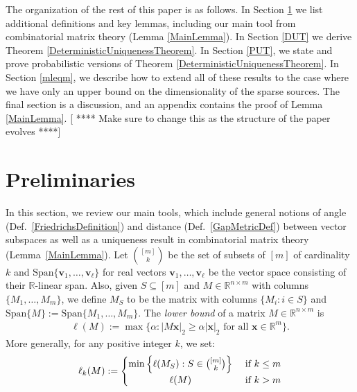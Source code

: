 \documentclass[journal, onecolumn]{IEEEtran}
\begin{document}
The organization of the rest of this paper is as follows. In Section \ref{Preliminaries} we list additional definitions and key lemmas, including our main tool from combinatorial matrix theory (Lemma \ref{MainLemma}). In Section \ref{DUT} we derive Theorem \ref{DeterministicUniquenessTheorem}. In Section \ref{PUT}, we state and prove probabilistic versions of Theorem \ref{DeterministicUniquenessTheorem}. In Section \ref{mleqm}, we describe how to extend all of these results to the case where we have only an upper bound on the dimensionality of the sparse sources. The final section is a discussion, and an appendix contains the proof of Lemma \ref{MainLemma}.
[ **** Make sure to change this as the structure of the paper evolves ****]


\section{Preliminaries}\label{Preliminaries}
In this section, we review our main tools, which include general notions of angle (Def.~\ref{FriedrichsDefinition}) and distance (Def.~\ref{GapMetricDef}) between vector subspaces as well as a uniqueness result in combinatorial matrix theory (Lemma~\ref{MainLemma}).
Let ${[m] \choose k}$ be the set of subsets of $[m]$ of cardinality $k$ and $\text{Span}\{\mathbf{v}_1, \ldots, \mathbf{v}_\ell\}$ for real vectors $\mathbf{v}_1, \ldots, \mathbf{v}_\ell$ be the vector space consisting of their $\mathbb{R}$-linear span.
%
%
Also, given $S \subseteq [m]$ and $M \in \mathbb{R}^{n \times m}$ with columns $\{M_1,\ldots,M_m\}$, we define $M_S$ to be the matrix with columns $\{M_i: i \in S\}$ and $\text{Span}\{M\} := \text{Span}\{M_1, \ldots, M_m\}$.  The \emph{lower bound} of a matrix $M \in \mathbb{R}^{n \times m}$ \cite{Grcar10} is 
\begin{align*}
\ell(M) := \max \{ \alpha : |M\mathbf{x}|_2 \geq \alpha|\mathbf{x}|_2 \text{ for all } \mathbf{x} \in \mathbb{R}^m\}.
\end{align*}
More generally, for any positive integer $k$, we set:
\[
 \ell_k(M) :=
  \begin{cases} 
      \hfill \min \left\{ \ell(M_S) : S \in {[m] \choose k} \right\} \hfill & \text{ if $k \leq m$} \\
      \hfill \ell(M) \hfill & \text{ if $k > m$} \\
  \end{cases}
\]
\end{document}
